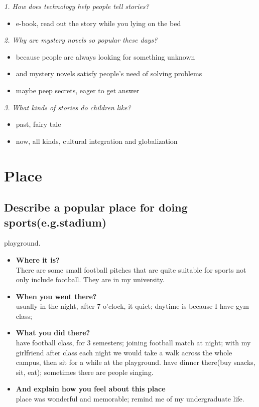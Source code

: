\documentclass[conference]{IEEEtran}
\begin{document}
\textit{1. How does technology help people tell stories?}
\begin{itemize}
    \item e-book, read out the story while you lying on the bed
\end{itemize}

\textit{2. Why are mystery novels so popular these days?}
\begin{itemize}
    \item because people are always looking for something unknown
    \item and mystery novels satisfy people's need of solving problems
    \item maybe peep secrets, eager to get answer
\end{itemize}

\textit{3. What kinds of stories do children like?}
\begin{itemize}
    \item past, fairy tale
    \item now, all kinds, cultural integration and globalization
\end{itemize}


\section{Place}
\subsection{Describe a popular place for doing sports(e.g.stadium)}
playground.
\begin{itemize}
    \item \textbf{Where it is?}\\
    There are some small football pitches that are quite suitable for sports not only include football.
    They are in my university.
    \item \textbf{When you went there?}\\
    usually in the night, after 7 o'clock, it quiet;
    daytime is because I have gym class;
    \item \textbf{What you did there?}\\
    have football class, for 3 semesters;
    joining football match at night;
    with my girlfriend after class each night we would take a walk across the whole campus, then sit for a while at the playground.
    have dinner there(buy snacks, sit, eat); sometimes there are people singing.
    \item \textbf{And explain how you feel about this place}\\
    place was wonderful and memorable;
    remind me of my undergraduate life.   
\end{itemize}
\end{document}

